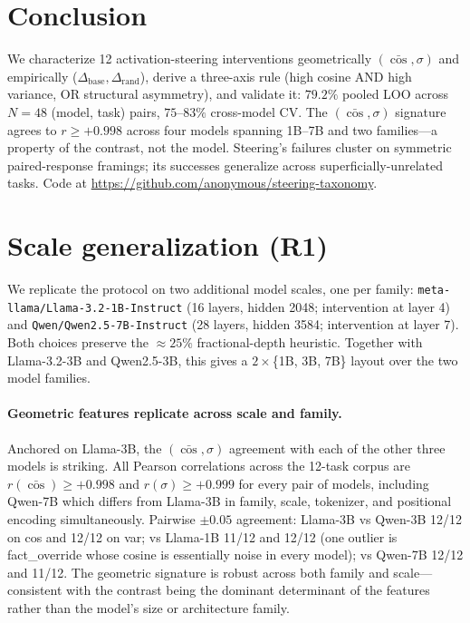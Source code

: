 \documentclass{article}
\begin{document}
\section{Conclusion}

We characterize 12 activation-steering interventions geometrically
$(\bar{\cos}, \sigma)$ and empirically
($\Delta_{\text{base}}, \Delta_{\text{rand}}$), derive a three-axis
rule (high cosine AND high variance, OR structural asymmetry), and
validate it: $79.2\%$ pooled LOO across $N{=}48$ (model, task)
pairs, $75$--$83\%$ cross-model CV. The $(\bar{\cos}, \sigma)$
signature agrees to $r \geq +0.998$ across four models spanning
1B--7B and two families---a property of the contrast, not the
model. Steering's failures cluster on symmetric paired-response
framings; its successes generalize across superficially-unrelated
tasks. Code at
\url{https://github.com/anonymous/steering-taxonomy}.




\appendix
\section{Scale generalization (R1)}
\label{app:scale}

We replicate the protocol on two additional model scales, one per
family: \texttt{meta-llama/Llama-3.2-1B-Instruct} (16 layers,
hidden 2048; intervention at layer 4) and
\texttt{Qwen/Qwen2.5-7B-Instruct} (28 layers, hidden 3584;
intervention at layer 7). Both choices preserve the $\approx 25\%$
fractional-depth heuristic. Together with Llama-3.2-3B and
Qwen2.5-3B, this gives a $2 \times$\{1B, 3B, 7B\} layout over the
two model families.

\paragraph{Geometric features replicate across scale and family.}
Anchored on Llama-3B, the $(\bar{\cos}, \sigma)$ agreement with each
of the other three models is striking. All Pearson correlations
across the 12-task corpus are $r(\bar{\cos}) \geq +0.998$ and
$r(\sigma) \geq +0.999$ for every pair of models, including
Qwen-7B which differs from Llama-3B in family, scale, tokenizer,
and positional encoding simultaneously. Pairwise $\pm 0.05$
agreement: Llama-3B vs Qwen-3B 12/12 on cos and 12/12 on var;
vs Llama-1B 11/12 and 12/12 (one outlier is fact\_override whose
cosine is essentially noise in every model); vs Qwen-7B 12/12 and
11/12. The geometric signature is robust across both family and
scale---consistent with the contrast being the dominant determinant
of the features rather than the model's size or architecture family.
\end{document}
